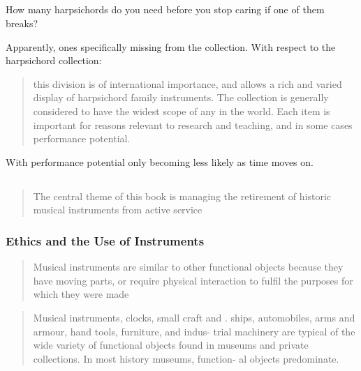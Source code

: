 \subsection{\cite{uoe_collections_2020}}

How many harpsichords do you need before you stop caring if one of them breaks?

Apparently, ones specifically missing from the collection. With respect to the
harpsichord collection:

\begin{quotation}
    this division is of international importance, and allows a rich and varied
    display of harpsichord family instruments.  The collection is generally
    considered to have the widest scope of any in the world. Each item is
    important for reasons relevant to research and teaching, and in some cases
    performance potential. 
\end{quotation}

With performance potential only becoming less likely as time moves on.

\subsection{\cite{barclay_care_1997}}

\begin{quotation}    
The central theme of this book is managing the retirement of historic musical
instruments from active service
\end{quotation}

\subsubsection{Ethics and the Use of Instruments}

\begin{quotation}
    Musical instruments are similar to other functional objects because they
    have moving parts, or require physical interaction to fulfil the purposes
    for which they were made
\end{quotation}

\begin{quotation}
    Musical instruments, clocks, small craft and . ships, automobiles, arms and
    armour, hand tools, furniture, and indus- trial machinery are typical of the
    wide variety of functional objects found in museums and private collections.
    In most history museums, function- al objects predominate.
\end{quotation}

